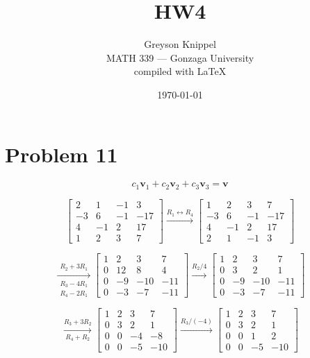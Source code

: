 \documentclass{article}
\title{HW4}
\author{
Greyson Knippel \\[4pt]
MATH 339 --- Gonzaga University \\[4pt]
compiled with \LaTeX{}
}
\date{\today}
\begin{document}
\maketitle

\section*{Problem 11}

\[
c_1\mathbf{v}_1 + c_2\mathbf{v}_2 + c_3\mathbf{v}_3 = \mathbf{v}
\]

\[
\left[\begin{array}{ccc|c}
2 & 1 & -1 & 3 \\
-3 & 6 & -1 & -17 \\
4 & -1 & 2 & 17 \\
1 & 2 & 3 & 7
\end{array}\right]
\xrightarrow{R_1 \leftrightarrow R_4}
\left[\begin{array}{ccc|c}
1 & 2 & 3 & 7 \\
-3 & 6 & -1 & -17 \\
4 & -1 & 2 & 17 \\
2 & 1 & -1 & 3
\end{array}\right]
\]

\[
\xrightarrow[\substack{R_3 - 4R_1 \\ R_4 - 2R_1}]{R_2 + 3R_1}
\left[\begin{array}{ccc|c}
1 & 2 & 3 & 7 \\
0 & 12 & 8 & 4 \\
0 & -9 & -10 & -11 \\
0 & -3 & -7 & -11
\end{array}\right]
\xrightarrow{R_2 / 4}
\left[\begin{array}{ccc|c}
1 & 2 & 3 & 7 \\
0 & 3 & 2 & 1 \\
0 & -9 & -10 & -11 \\
0 & -3 & -7 & -11
\end{array}\right]
\]

\[
\xrightarrow[R_4 + R_2]{R_3 + 3R_2}
\left[\begin{array}{ccc|c}
1 & 2 & 3 & 7 \\
0 & 3 & 2 & 1 \\
0 & 0 & -4 & -8 \\
0 & 0 & -5 & -10
\end{array}\right]
\xrightarrow{R_3 / (-4)}
\left[\begin{array}{ccc|c}
1 & 2 & 3 & 7 \\
0 & 3 & 2 & 1 \\
0 & 0 & 1 & 2 \\
0 & 0 & -5 & -10
\end{array}\right]
\]
\end{document}
